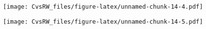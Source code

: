 \documentclass[
]{article}
\newenvironment{Shaded}{\begin{snugshade}}{\end{snugshade}}
\newcommand{\DataTypeTok}[1]{\textcolor[rgb]{0.13,0.29,0.53}{#1}}
\newcommand{\FloatTok}[1]{\textcolor[rgb]{0.00,0.00,0.81}{#1}}
\newcommand{\KeywordTok}[1]{\textcolor[rgb]{0.13,0.29,0.53}{\textbf{#1}}}
\newcommand{\NormalTok}[1]{#1}
\newcommand{\OperatorTok}[1]{\textcolor[rgb]{0.81,0.36,0.00}{\textbf{#1}}}
\newcommand{\StringTok}[1]{\textcolor[rgb]{0.31,0.60,0.02}{#1}}
\begin{document}
\begin{Shaded}
\end{Shaded}

\texttt{[image: CvsRW\_files/figure-latex/unnamed-chunk-14-4.pdf]}

\begin{Shaded}
\end{Shaded}

\texttt{[image: CvsRW\_files/figure-latex/unnamed-chunk-14-5.pdf]}
\end{document}
